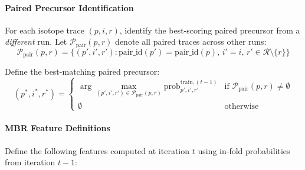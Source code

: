 \documentclass[pdflatex,sn-nature]{sn-jnl}
\begin{document}
\paragraph{Paired Precursor Identification}\label{para:paired-precursor-identification} For each isotope trace $(p,i,r)$, identify the best-scoring paired precursor from a \emph{different} run. Let $\mathcal{P}_{\text{pair}}(p, r)$ denote all paired traces across other runs:
\begin{equation}
\mathcal{P}_{\text{pair}}(p, r) = \{(p', i', r') : \text{pair\_id}(p') = \text{pair\_id}(p), \, i' = i, \, r' \in \mathcal{R} \setminus \{r\}\}
\end{equation}

Define the best-matching paired precursor:
\begin{equation}
(p^*, i^*, r^*) = \begin{cases}
  \displaystyle\arg\max_{(p',i',r') \in \mathcal{P}_{\text{pair}}(p,r)} \text{prob}_{p',i',r'}^{\text{train},(t-1)} & \text{if } \mathcal{P}_{\text{pair}}(p,r) \neq \emptyset \\
  \emptyset & \text{otherwise}
\end{cases}
\end{equation}

\paragraph{MBR Feature Definitions}\label{para:mbr-feature-definitions} Define the following features computed at iteration $t$ using in-fold probabilities from iteration $t-1$:
\end{document}
